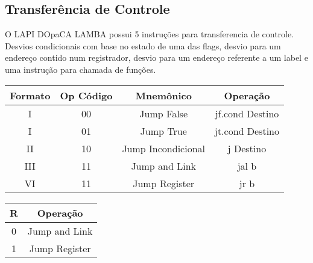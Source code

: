 \documentclass{article}
\begin{document}
  \subsection{Transferência de Controle}
  
  O LAPI DOpaCA LAMBA possui 5 instruções para transferencia de controle. Desvios condicionais com base no estado de uma das flags, desvio para um endereço contido num registrador, desvio para um endereço referente a um label e uma instrução para chamada de funções. 
  
   		 \begin{table}[H]
      \begin{center}
        \begin{tabular}[pos]{|c|c|c|c|} 
        \hline
			\cellcolor[gray]{0.9}\textbf{Formato} & \cellcolor[gray]{0.9}\textbf{Op Código} & \cellcolor[gray] {0.9}\textbf{Mnemônico} & \cellcolor[gray] {0.9}\textbf{Operação} \\ \hline    		
          I & 00	& Jump False 	& jf.cond Destino\\ \hline
		   I & 01 & Jump True &	jt.cond Destino \\ \hline
           II & 10 & Jump Incondicional &	j Destino\\ \hline
           III & 11 & Jump and Link &	jal b \\ \hline
           VI & 11 &	Jump Register &	jr b \\ \hline
    	\end{tabular}
      \end{center}
    \end{table}
   
   \begin{table}[H]
      \begin{center}
        \begin{tabular}[pos]{|c|c|} 
        \hline
			\cellcolor[gray]{0.9}\textbf{R} & \cellcolor[gray] {0.9}\textbf{Operação} \\ \hline    		
            0 & Jump and Link \\ \hline
			1 & Jump Register \\ \hline
    	\end{tabular}
      \end{center}
    \end{table}
    
\end{document}
